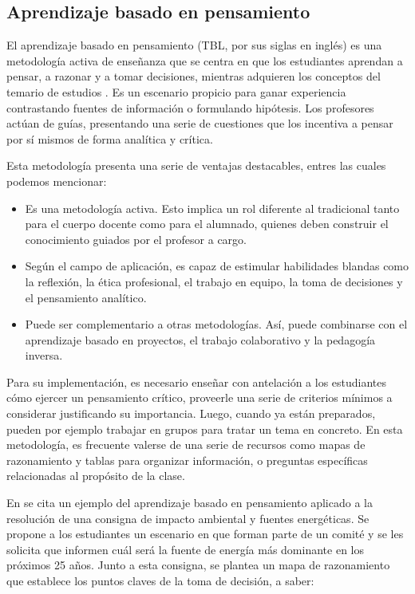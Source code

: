 \documentclass[conference]{IEEEtran}
\begin{document}
\subsection{Aprendizaje basado en pensamiento}
\label{scrivauto:17}

El aprendizaje basado en pensamiento (TBL, por sus siglas en inglés) es una metodología activa de enseñanza que se centra en que los estudiantes aprendan a pensar, a razonar y a tomar decisiones, mientras adquieren los conceptos del temario de estudios \cite{b13}. Es un escenario propicio para ganar experiencia contrastando fuentes de información o formulando hipótesis. Los profesores actúan de guías, presentando una serie de cuestiones que los incentiva a pensar por sí mismos de forma analítica y crítica.

Esta metodología presenta una serie de ventajas destacables, entres las cuales podemos mencionar:

\begin{itemize}
    \item Es una metodología activa. Esto implica un rol diferente al tradicional tanto para el cuerpo docente como para el alumnado, quienes deben construir el conocimiento guiados por el profesor a cargo. 
    \item Según el campo de aplicación, es capaz de estimular habilidades blandas como la reflexión, la ética profesional, el trabajo en equipo, la toma de decisiones y el pensamiento analítico.
    \item Puede ser complementario a otras metodologías. Así, puede combinarse con el aprendizaje basado en proyectos, el trabajo colaborativo y la pedagogía inversa.
\end{itemize}

 Para su implementación, es necesario enseñar con antelación a los estudiantes cómo ejercer un pensamiento crítico, proveerle una serie de criterios mínimos a considerar justificando su importancia. Luego, cuando ya están preparados, pueden por ejemplo trabajar en grupos para tratar un tema en concreto. En esta metodología, es frecuente valerse de una serie de recursos como mapas de razonamiento y tablas para organizar información, o preguntas específicas relacionadas al propósito de la clase.

En \cite{b14} se cita un ejemplo del aprendizaje basado en pensamiento aplicado a la resolución de una consigna de impacto ambiental y fuentes energéticas. Se propone a los estudiantes un escenario en que forman parte de un comité y se les solicita que informen cuál será la fuente de energía más dominante en los próximos 25 años. Junto a esta consigna, se plantea un mapa de razonamiento que establece los puntos claves de la toma de decisión, a saber:
\end{document}
